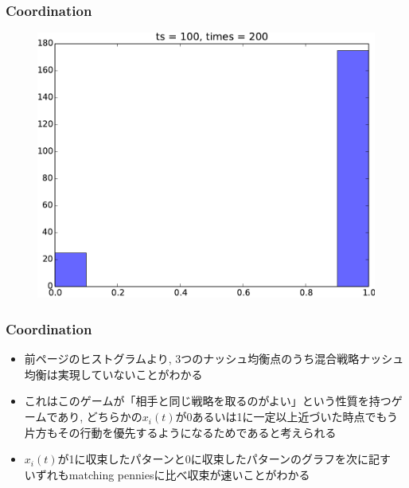 \documentclass[dvipdfmx,fleqn,handout]{beamer}
\begin{document}
\begin{frame}
\frametitle{Coordination}
\begin{figure}
 \centering
 \includegraphics[width=\linewidth]{coordhist.pdf}
 \label{fig:coordination_hist}
\end{figure}
\end{frame}


\begin{frame}
\frametitle{Coordination}
\begin{itemize}\setlength{\parskip}{0.5em}
\item
前ページのヒストグラムより, 3つのナッシュ均衡点のうち混合戦略ナッシュ均衡は実現していないことがわかる\pause
\item
これはこのゲームが「相手と同じ戦略を取るのがよい」という性質を持つゲームであり, どちらかの$x_i(t)$が0あるいは1に一定以上近づいた時点でもう片方もその行動を優先するようになるためであると考えられる\pause
\item
$x_i(t)$が1に収束したパターンと0に収束したパターンのグラフを次に記す\pause\\
いずれもmatching penniesに比べ収束が速いことがわかる
\end{itemize}
\end{frame}
\end{document}
